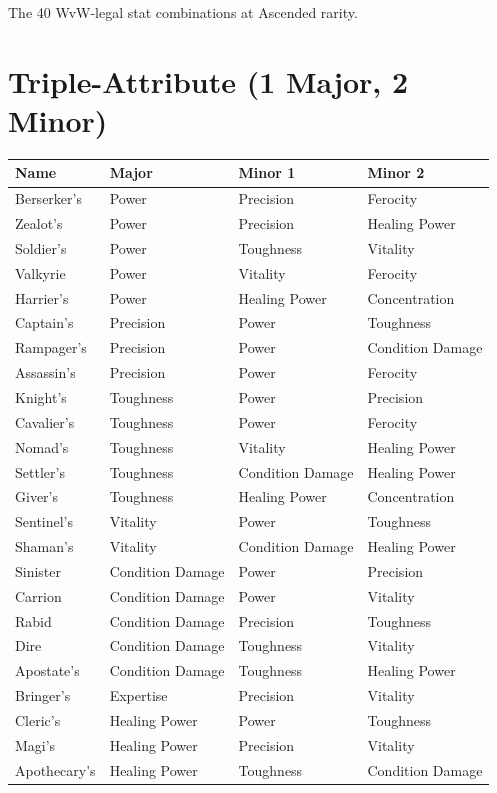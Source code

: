 \documentclass[11pt, a4paper, oneside]{book}
\begin{document}
The 40 WvW-legal stat combinations at Ascended rarity.

\section{Triple-Attribute (1 Major, 2 Minor)}

\begin{center}
\small
\begin{longtable}{llll}
\toprule
\textbf{Name} & \textbf{Major} & \textbf{Minor 1} & \textbf{Minor 2} \\
\midrule
\endhead
Berserker's & Power & Precision & Ferocity \\
Zealot's & Power & Precision & Healing Power \\
Soldier's & Power & Toughness & Vitality \\
Valkyrie & Power & Vitality & Ferocity \\
Harrier's & Power & Healing Power & Concentration \\
Captain's & Precision & Power & Toughness \\
Rampager's & Precision & Power & Condition Damage \\
Assassin's & Precision & Power & Ferocity \\
Knight's & Toughness & Power & Precision \\
Cavalier's & Toughness & Power & Ferocity \\
Nomad's & Toughness & Vitality & Healing Power \\
Settler's & Toughness & Condition Damage & Healing Power \\
Giver's & Toughness & Healing Power & Concentration \\
Sentinel's & Vitality & Power & Toughness \\
Shaman's & Vitality & Condition Damage & Healing Power \\
Sinister & Condition Damage & Power & Precision \\
Carrion & Condition Damage & Power & Vitality \\
Rabid & Condition Damage & Precision & Toughness \\
Dire & Condition Damage & Toughness & Vitality \\
Apostate's & Condition Damage & Toughness & Healing Power \\
Bringer's & Expertise & Precision & Vitality \\
Cleric's & Healing Power & Power & Toughness \\
Magi's & Healing Power & Precision & Vitality \\
Apothecary's & Healing Power & Toughness & Condition Damage \\
\bottomrule
\end{longtable}
\end{center}
\end{document}
